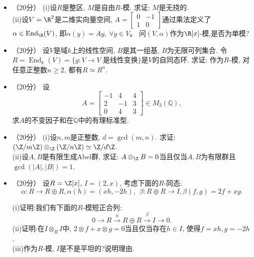 ~\\
\begin{center}
\end{center}
\begin{itemize}
\item[1.]（20分）
(i)设$R$是整区, $M$是自由$R$-模. 求证: $M$是无挠的.\\
(ii)设$V = \R^2$是二维实向量空间, $A = \begin{bmatrix}
    0 & -1 \\
    1 & 0
\end{bmatrix}$通过乘法定义了$\alpha\in \operatorname{End}_{\R}(V)$,
即$\alpha(y) = Ay,\ \forall y\in V$。
问$(V,\alpha)$作为$\R[x]$-模,是否为单模?

\item[2.]（20分）
设$V$是域$k$上的线性空间, $B$是其一组基, $B$为无限可列集合.
令$R = \operatorname{End}_{k} (V) = \{g:V\to V\text{ 是线性变换} \}$是$V$的自同态环.
求证: 作为$R$-模, 对任意正整数$n\geq2$, 都有$R\simeq R^n$.

\item[3.]（20分）
设
$$A =\begin{bmatrix}
    -1 & 4 & 4 \\
    2 & -1 & 3 \\
    0 & 4 & 3
\end{bmatrix} \in M_3(\mathbb{Q}),$$
求$A$的不变因子和在$\mathbb{Q}$中的有理标准型.

\item[4.]（20分）
(i)设$n,m$是正整数, $d = \gcd(m,n)$. 求证: $(\Z/m\Z) \otimes_{\Z} (\Z / n\Z) \simeq \Z/d\Z$.\\
(ii)设$A,B$是有限生成Abel群, 求证: $A\otimes_{\Z}B = 0$当且仅当$A,B$为有限群且$\gcd(|A|,|B|) = 1$.

\item[5.]（20分）
设$R = \Z[x]$, $I = (2,x)$, 考虑下面的$R$-同态:
$$\alpha : R \to R\oplus R, \alpha (h) = (xh, -2h), \ \ \beta : R \oplus R \to I, \beta(f,g) = 2f+xg.$$

(i)证明:我们有下面的$R$-模短正合列:
$$0 \to R \stackrel{\alpha}{\to} R \oplus R \stackrel{\beta}{\to} I \to 0.$$
(ii)证明:在$I\otimes_{R} I$中, $2\otimes f + x\otimes g = 0$当且仅当存在$h\in I$, 使得$f=xh, g=-2h$.\\
(iii)作为$R$-模, $I$是不是平坦的?说明理由.
\end{itemize}

